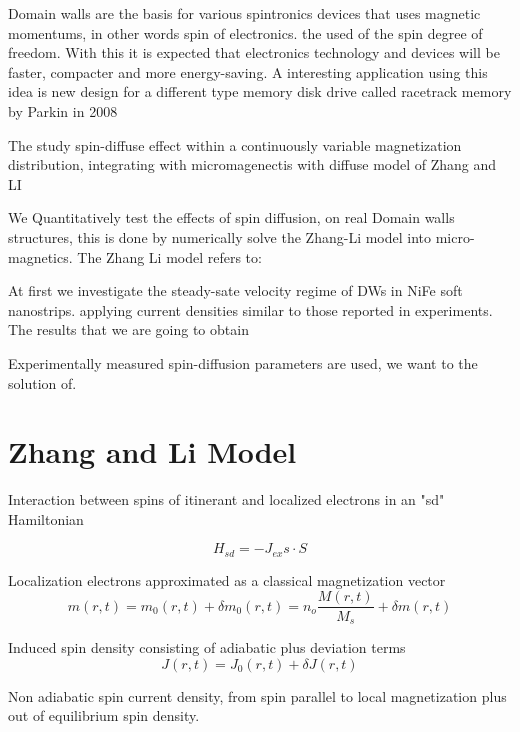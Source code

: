 Domain walls are the basis for various spintronics devices that uses magnetic momentums, in other words spin of electronics. the used of the spin degree of freedom. With this it is expected that electronics technology and devices will be faster, compacter and more energy-saving. A interesting application using this idea is new design for a different type memory disk drive called racetrack memory by Parkin in 2008\cite{racetrack}



The study spin-diffuse effect within a continuously variable magnetization distribution, integrating with micromagenectis with diffuse model of Zhang and LI \cite{claudio}


We Quantitatively test the effects of spin diffusion, on real Domain walls structures, this is done by numerically solve the Zhang-Li model \cite{zhang} into micro-magnetics.
The Zhang Li model refers to:


At first we investigate the steady-sate velocity regime of DWs in NiFe soft nanostrips. applying current densities similar to those reported in experiments. The results that we are going to obtain

Experimentally measured spin-diffusion parameters are used, we want to the solution of.

\section{Zhang and Li Model}

Interaction between spins of itinerant and localized electrons in an "sd" Hamiltonian

\begin{equation}
H_{sd} = -J_{ex}s \cdot S
\end{equation}


Localization electrons approximated as a classical magnetization vector
\begin{equation}
m(r,t) = m_{0}(r,t) + \delta m_{0}(r,t) = n_{o} \frac{M(r,t)}{M_{s}} + \delta m(r,t)
\end{equation}


Induced spin density consisting of adiabatic plus deviation terms
\begin{equation}
J(r,t) = J_{0}(r,t) + \delta J(r,t)
\end{equation}


Non adiabatic spin current density, from spin parallel to local magnetization plus out of equilibrium spin density.

